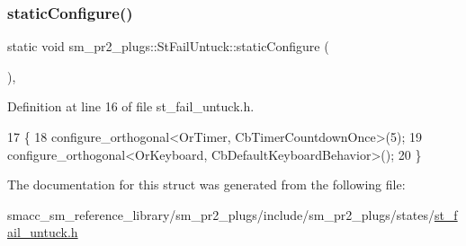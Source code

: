 \subsubsection{\texorpdfstring{static\+Configure()}{staticConfigure()}}
{\footnotesize\ttfamily static void sm\+\_\+pr2\+\_\+plugs\+::\+St\+Fail\+Untuck\+::static\+Configure (\begin{DoxyParamCaption}{ }\end{DoxyParamCaption})\hspace{0.3cm}{\ttfamily [inline]}, {\ttfamily [static]}}



Definition at line 16 of file st\+\_\+fail\+\_\+untuck.\+h.


\begin{DoxyCode}
17     \{
18         configure\_orthogonal<OrTimer,  CbTimerCountdownOnce>(5);    
19         configure\_orthogonal<OrKeyboard, CbDefaultKeyboardBehavior>();
20     \}
\end{DoxyCode}


The documentation for this struct was generated from the following file\+:\begin{DoxyCompactItemize}
\item 
smacc\+\_\+sm\+\_\+reference\+\_\+library/sm\+\_\+pr2\+\_\+plugs/include/sm\+\_\+pr2\+\_\+plugs/states/\hyperlink{st__fail__untuck_8h}{st\+\_\+fail\+\_\+untuck.\+h}\end{DoxyCompactItemize}
